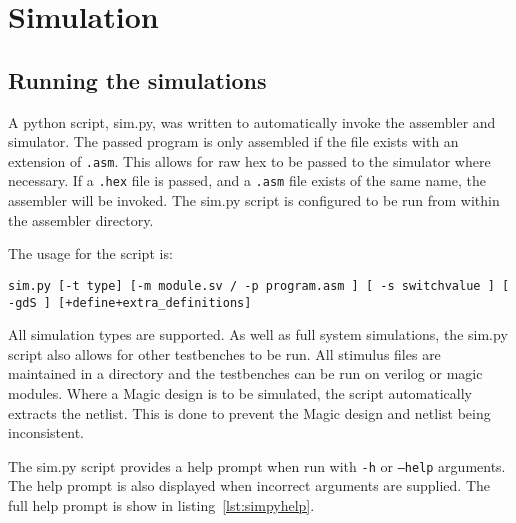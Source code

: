 
\section{Simulation}

\subsection{Running the simulations}



A python script, sim.py, was written to automatically invoke the assembler and simulator. 
The passed program is only assembled if the file exists with an extension of \texttt{.asm}. 
This allows for raw hex to be passed to the simulator where necessary. 
If a \texttt{.hex} file is passed, and a \texttt{.asm} file exists of the same name, the assembler will be invoked.
The sim.py script is configured to be run from within the assembler directory.

The usage for the script is:
\begin{center}
\texttt{sim.py [-t type] [-m module.sv / -p program.asm ] [ -s switchvalue ] [ -gdS ] [+define+extra\_definitions]}
\end{center}

All simulation types are supported. 
As well as full system simulations, the sim.py script also allows for other testbenches to be run.
All stimulus files are maintained in a directory and the testbenches can be run on verilog or magic modules. 
Where a Magic design is to be simulated, the script automatically extracts the netlist. 
This is done to prevent the Magic design and netlist being inconsistent. 

The sim.py script provides a help prompt when run with \texttt{-h} or \texttt{--help} arguments. 
The help prompt is also displayed when incorrect arguments are supplied. 
The full help prompt is show in listing~\ref{lst:simpyhelp}. 

